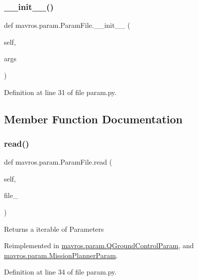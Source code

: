 \subsubsection{\texorpdfstring{\_\_init\_\_()}{\_\_init\_\_()}}
{\footnotesize\ttfamily def mavros.\+param.\+Param\+File.\+\_\+\+\_\+init\+\_\+\+\_\+ (\begin{DoxyParamCaption}\item[{}]{self,  }\item[{}]{args }\end{DoxyParamCaption})}



Definition at line 31 of file param.\+py.



\subsection{Member Function Documentation}
\mbox{\label{classmavros_1_1param_1_1ParamFile_adb004524182c02e4bd16705c259895d2}} 
\subsubsection{\texorpdfstring{read()}{read()}}
{\footnotesize\ttfamily def mavros.\+param.\+Param\+File.\+read (\begin{DoxyParamCaption}\item[{}]{self,  }\item[{}]{file\+\_\+ }\end{DoxyParamCaption})}

\begin{DoxyVerb}Returns a iterable of Parameters\end{DoxyVerb}
 

Reimplemented in \mbox{\hyperlink{classmavros_1_1param_1_1QGroundControlParam_af1e7488ab8a9b48f3eddd07307a8f74e}{mavros.\+param.\+Q\+Ground\+Control\+Param}}, and \mbox{\hyperlink{classmavros_1_1param_1_1MissionPlannerParam_a63149181028a5484884aebc70499ec97}{mavros.\+param.\+Mission\+Planner\+Param}}.



Definition at line 34 of file param.\+py.

\mbox{\label{classmavros_1_1param_1_1ParamFile_ad1027ff8e4ed8681f36e096447d110bb}} 

